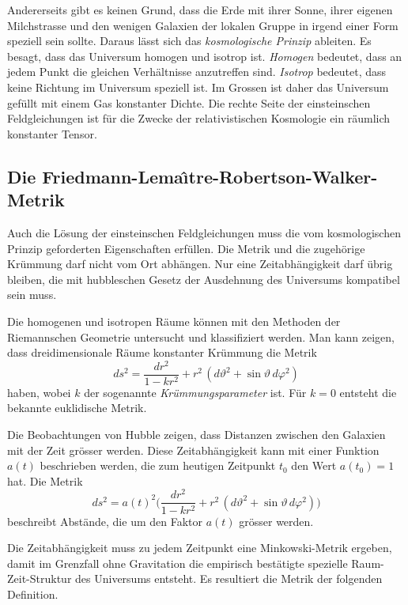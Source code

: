 Andererseits gibt es keinen Grund, dass die Erde mit ihrer Sonne, ihrer
eigenen Milchstrasse und den wenigen Galaxien der lokalen Gruppe in
irgend einer Form speziell sein sollte.
Daraus lässt sich das \emph{kosmologische Prinzip} ableiten.
%
Es besagt, dass das Universum homogen und isotrop ist.
\emph{Homogen} bedeutet, dass an jedem Punkt die gleichen Verhältnisse
anzutreffen sind.
%
\emph{Isotrop} bedeutet, dass keine Richtung im Universum speziell ist.
Im Grossen ist daher das Universum gefüllt mit einem Gas konstanter
Dichte.
%
Die rechte Seite der einsteinschen Feldgleichungen ist für die 
Zwecke der relativistischen Kosmologie ein räumlich konstanter Tensor.

%
%
\subsection{Die Friedmann-Lema\^\i tre-Robertson-Walker-Metrik}
Auch die Lösung der einsteinschen Feldgleichungen muss die vom
kosmologischen Prinzip geforderten Eigenschaften erfüllen.
Die Metrik und die zugehörige Krümmung darf nicht vom Ort
abhängen.
Nur eine Zeitabhängigkeit darf übrig bleiben, die mit hubbleschen
Gesetz der Ausdehnung des Universums kompatibel sein muss.

Die homogenen und isotropen Räume können mit den Methoden der
Riemannschen Geometrie untersucht und klassifiziert werden.
Man kann zeigen, dass dreidimensionale Räume konstanter Krümmung 
die Metrik
\[
ds^2
=
\frac{dr^2}{1-kr^2} + r^2\,(d\vartheta^2 + \sin\vartheta\,d\varphi^2)
\]
haben, wobei $k$ der sogenannte \emph{Krümmungsparameter} ist.
Für $k=0$ entsteht die bekannte euklidische Metrik.

Die Beobachtungen von Hubble zeigen, dass Distanzen zwischen
den Galaxien mit der Zeit grösser werden.
Diese Zeitabhängigkeit kann mit einer Funktion $a(t)$ beschrieben
werden, die zum heutigen Zeitpunkt $t_0$ den Wert $a(t_0)=1$ hat.
Die Metrik
\begin{equation}
ds^2
=
a(t)^2
\biggl(
\frac{dr^2}{1-kr^2} + r^2\,(d\vartheta^2 + \sin\vartheta\,d\varphi^2)
\biggr)
\label{buch:kruemmung:kosmologie:eqn:ads}
\end{equation}
beschreibt Abstände, die um den Faktor $a(t)$ grösser werden.

Die Zeitabhängigkeit muss zu jedem Zeitpunkt eine Minkowski-Metrik
ergeben, damit im Grenzfall ohne Gravitation die empirisch bestätigte
spezielle Raum-Zeit-Struktur des Universums entsteht.
Es resultiert die Metrik der folgenden Definition.

